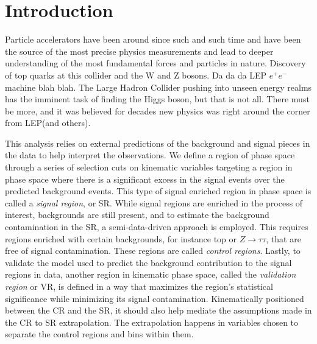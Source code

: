 \chapter{Introduction}

Particle accelerators have been around since such and such time and have been the source of the most precise physics measurements and lead to deeper understanding of the most fundamental forces and particles in nature.  Discovery of top quarks at this collider and the W and Z bosons.  Da da da LEP $e^+e^-$ machine blah blah.  The Large Hadron Collider pushing into unseen energy realms has the imminent task of finding the Higgs boson, but that is not all.  There must be more, and it was believed for decades new physics was right around the corner from LEP(and others).  

This analysis relies on external predictions of the background and signal pieces in the data to help interpret the observations.  We define a region of phase space through a series of selection cuts on kinematic variables targeting a region in phase space where there is a significant excess in the signal events over the predicted background events.  This type of signal enriched region in phase space is called a \textit{signal region}, or SR.  While signal regions are enriched in the process of interest, backgrounds are still present, and to estimate the background contamination in the SR, a semi-data-driven approach is employed.  This requires regions enriched with certain backgrounds, for instance top or $Z\rightarrow\tau\tau$, that are free of signal contamination.  These regions are called \textit{control regions}.  Lastly, to validate the model used to predict the background contribution to the signal regions in data, another region in kinematic phase space, called the \textit{validation region} or VR, is defined in a way that maximizes the region's statistical significance while minimizing its signal contamination.  Kinematically positioned between the CR and the SR, it should also help mediate the assumptions made in the CR to SR extrapolation.  The extrapolation happens in variables chosen to separate the control regions and bins within them.

